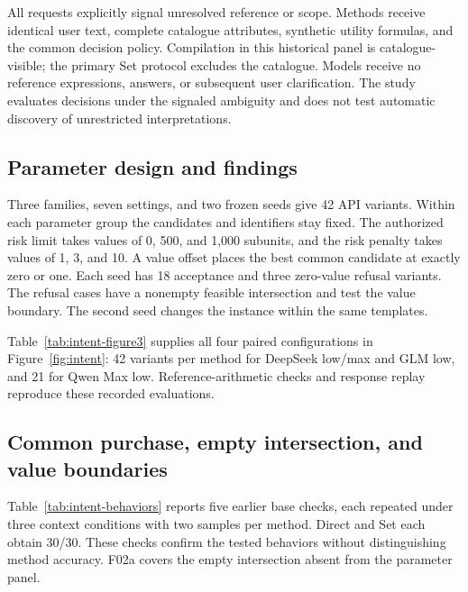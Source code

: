 All requests explicitly signal unresolved reference or scope. Methods receive identical user text, complete catalogue attributes, synthetic utility formulas, and the common decision policy. Compilation in this historical panel is catalogue-visible; the primary Set protocol excludes the catalogue. Models receive no reference expressions, answers, or subsequent user clarification. The study evaluates decisions under the signaled ambiguity and does not test automatic discovery of unrestricted interpretations.

\subsection{Parameter design and findings}
Three families, seven settings, and two frozen seeds give 42 API variants. Within each parameter group the candidates and identifiers stay fixed. The authorized risk limit takes values of 0, 500, and 1,000 subunits, and the risk penalty takes values of 1, 3, and 10. A value offset places the best common candidate at exactly zero or one. Each seed has 18 acceptance and three zero-value refusal variants. The refusal cases have a nonempty feasible intersection and test the value boundary. The second seed changes the instance within the same templates.

Table~\ref{tab:intent-figure3} supplies all four paired configurations in Figure~\ref{fig:intent}: 42 variants per method for DeepSeek low/max and GLM low, and 21 for Qwen Max low. Reference-arithmetic checks and response replay reproduce these recorded evaluations.

\begin{table}[!tbp]
\centering\small
\setlength{\tabcolsep}{6pt}

\caption{Complete results underlying Figure~\ref{fig:intent}. Each arrow is Direct$\to$Set; $n$ is the number of matched tasks per method. Exact, unsafe acceptance, false refusal, and Other form a disjoint partition of each method's $n$ outcomes. Other includes remaining value and execution failures. The four rows contain 294 evaluations in total and are separate from the primary 200-task benchmark.}
\label{tab:intent-figure3}
\end{table}

\subsection{Common purchase, empty intersection, and value boundaries}
Table~\ref{tab:intent-behaviors} reports five earlier base checks, each repeated under three context conditions with two samples per method. Direct and Set each obtain 30/30. These checks confirm the tested behaviors without distinguishing method accuracy. F02a covers the empty intersection absent from the parameter panel.

